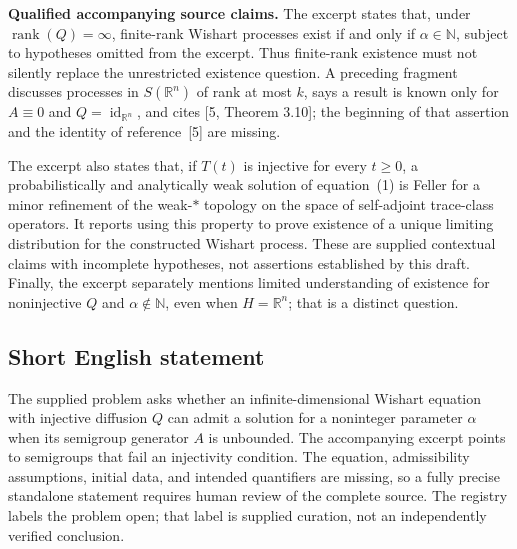 \documentclass[11pt]{article}
\begin{document}
\textbf{Qualified accompanying source claims.} The excerpt states that, under \(\operatorname{rank}(Q)=\infty\), finite-rank Wishart processes exist if and only if \(\alpha\in\mathbb N\), subject to hypotheses omitted from the excerpt. Thus finite-rank existence must not silently replace the unrestricted existence question. A preceding fragment discusses processes in \(S(\mathbb R^n)\) of rank at most \(k\), says a result is known only for \(A\equiv0\) and \(Q=\operatorname{id}_{\mathbb R^n}\), and cites [5, Theorem 3.10]; the beginning of that assertion and the identity of reference~[5] are missing.

The excerpt also states that, if \(T(t)\) is injective for every \(t\geq0\), a probabilistically and analytically weak solution of equation~(1) is Feller for a minor refinement of the weak-\(*\) topology on the space of self-adjoint trace-class operators. It reports using this property to prove existence of a unique limiting distribution for the constructed Wishart process. These are supplied contextual claims with incomplete hypotheses, not assertions established by this draft. Finally, the excerpt separately mentions limited understanding of existence for noninjective \(Q\) and \(\alpha\notin\mathbb N\), even when \(H=\mathbb R^n\); that is a distinct question.
\subsection{Short English statement}
The supplied problem asks whether an infinite-dimensional Wishart equation with injective diffusion \(Q\) can admit a solution for a noninteger parameter \(\alpha\) when its semigroup generator \(A\) is unbounded. The accompanying excerpt points to semigroups that fail an injectivity condition. The equation, admissibility assumptions, initial data, and intended quantifiers are missing, so a fully precise standalone statement requires human review of the complete source. The registry labels the problem open; that label is supplied curation, not an independently verified conclusion.
\end{document}
